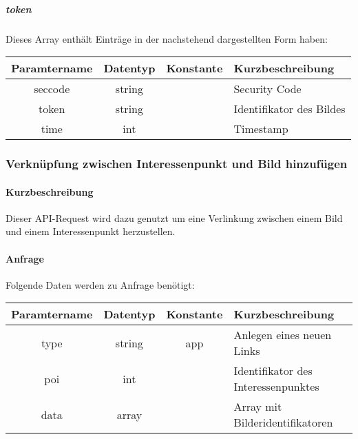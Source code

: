 \subparagraph{token}Dieses Array enthält Einträge in der nachstehend dargestellten Form haben:
\begin{table}[H]
	\begin{tabular}{|c|c|c|p{6.5cm}|}
		\hline
		\textbf{Paramtername} & \textbf{Datentyp} & \textbf{Konstante} & \textbf{Kurzbeschreibung}    \\ \hline
		seccode                & string          &                 & Security Code \\ \hline
		token                  & string          &                 & Identifikator des Bildes \\ \hline
		time                   & int             &                 & Timestamp \\ \hline
	\end{tabular}
\end{table}
\subsubsection{Verknüpfung zwischen Interessenpunkt und Bild hinzufügen}
\paragraph{Kurzbeschreibung}Dieser API-Request wird dazu genutzt um eine Verlinkung zwischen einem Bild und einem Interessenpunkt herzustellen.
\paragraph{Anfrage}Folgende Daten werden zu Anfrage benötigt:
\begin{table}[H]
	\begin{tabular}{|c|c|c|p{6.5cm}|}
		\hline
		\textbf{Paramtername} & \textbf{Datentyp} & \textbf{Konstante} & \textbf{Kurzbeschreibung}                                                                                               \\ \hline
		type                & string            & app                & Anlegen eines neuen Links \\ \hline
		poi                 & int               &                    & Identifikator des Interessenpunktes \\ \hline
		data                & array             &                    & Array mit Bilderidentifikatoren \\ \hline
	\end{tabular}
\end{table}
